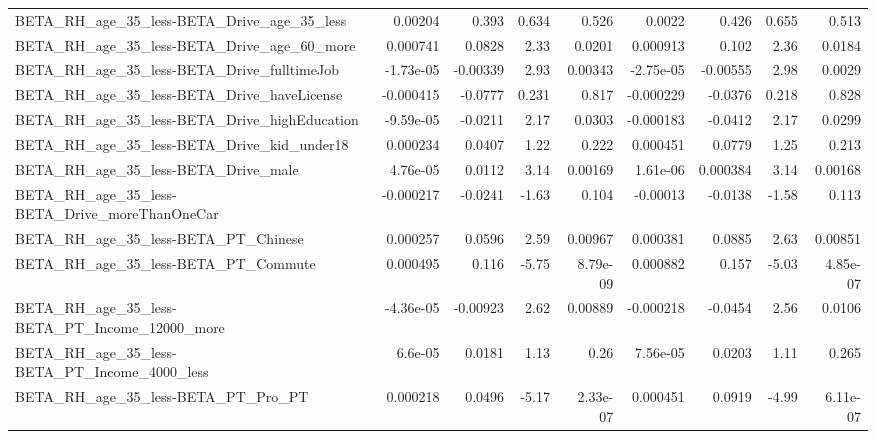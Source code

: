 \begin{tabular}{lrrrrrrrr}
BETA\_RH\_age\_35\_less-BETA\_Drive\_age\_35\_less         &     0.00204 &        0.393 &     0.634 &    0.526 &     0.0022 &       0.426 &        0.655 &         0.513 \\
BETA\_RH\_age\_35\_less-BETA\_Drive\_age\_60\_more         &    0.000741 &       0.0828 &      2.33 &   0.0201 &   0.000913 &       0.102 &         2.36 &        0.0184 \\
BETA\_RH\_age\_35\_less-BETA\_Drive\_fulltimeJob         &   -1.73e-05 &     -0.00339 &      2.93 &  0.00343 &  -2.75e-05 &    -0.00555 &         2.98 &        0.0029 \\
BETA\_RH\_age\_35\_less-BETA\_Drive\_haveLicense         &   -0.000415 &      -0.0777 &     0.231 &    0.817 &  -0.000229 &     -0.0376 &        0.218 &         0.828 \\
BETA\_RH\_age\_35\_less-BETA\_Drive\_highEducation       &   -9.59e-05 &      -0.0211 &      2.17 &   0.0303 &  -0.000183 &     -0.0412 &         2.17 &        0.0299 \\
BETA\_RH\_age\_35\_less-BETA\_Drive\_kid\_under18         &    0.000234 &       0.0407 &      1.22 &    0.222 &   0.000451 &      0.0779 &         1.25 &         0.213 \\
BETA\_RH\_age\_35\_less-BETA\_Drive\_male                &    4.76e-05 &       0.0112 &      3.14 &  0.00169 &   1.61e-06 &    0.000384 &         3.14 &       0.00168 \\
BETA\_RH\_age\_35\_less-BETA\_Drive\_moreThanOneCar      &   -0.000217 &      -0.0241 &     -1.63 &    0.104 &   -0.00013 &     -0.0138 &        -1.58 &         0.113 \\
BETA\_RH\_age\_35\_less-BETA\_PT\_Chinese                &    0.000257 &       0.0596 &      2.59 &  0.00967 &   0.000381 &      0.0885 &         2.63 &       0.00851 \\
BETA\_RH\_age\_35\_less-BETA\_PT\_Commute                &    0.000495 &        0.116 &     -5.75 & 8.79e-09 &   0.000882 &       0.157 &        -5.03 &      4.85e-07 \\
BETA\_RH\_age\_35\_less-BETA\_PT\_Income\_12000\_more      &   -4.36e-05 &     -0.00923 &      2.62 &  0.00889 &  -0.000218 &     -0.0454 &         2.56 &        0.0106 \\
BETA\_RH\_age\_35\_less-BETA\_PT\_Income\_4000\_less       &     6.6e-05 &       0.0181 &      1.13 &     0.26 &   7.56e-05 &      0.0203 &         1.11 &         0.265 \\
BETA\_RH\_age\_35\_less-BETA\_PT\_Pro\_PT                 &    0.000218 &       0.0496 &     -5.17 & 2.33e-07 &   0.000451 &      0.0919 &        -4.99 &      6.11e-07 \\

\end{tabular}

